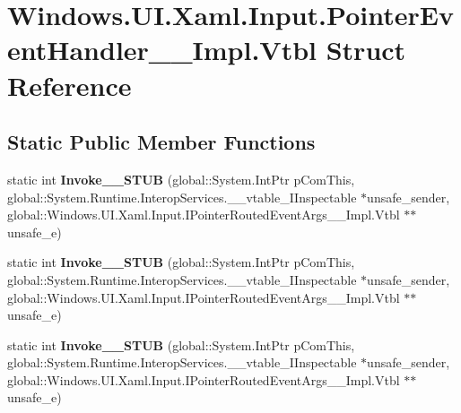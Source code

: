 \hypertarget{struct_windows_1_1_u_i_1_1_xaml_1_1_input_1_1_pointer_event_handler_____impl_1_1_vtbl}{}\section{Windows.\+U\+I.\+Xaml.\+Input.\+Pointer\+Event\+Handler\+\_\+\+\_\+\+Impl.\+Vtbl Struct Reference}
\label{struct_windows_1_1_u_i_1_1_xaml_1_1_input_1_1_pointer_event_handler_____impl_1_1_vtbl}
\subsection*{Static Public Member Functions}
\begin{DoxyCompactItemize}
\item 
\mbox{\label{struct_windows_1_1_u_i_1_1_xaml_1_1_input_1_1_pointer_event_handler_____impl_1_1_vtbl_a5eaf62a037e55b8700d73ad4051994b3}} 
static int {\bfseries Invoke\+\_\+\+\_\+\+S\+T\+UB} (global\+::\+System.\+Int\+Ptr p\+Com\+This, global\+::\+System.\+Runtime.\+Interop\+Services.\+\_\+\+\_\+vtable\+\_\+\+I\+Inspectable $\ast$unsafe\+\_\+sender, global\+::\+Windows.\+U\+I.\+Xaml.\+Input.\+I\+Pointer\+Routed\+Event\+Args\+\_\+\+\_\+\+Impl.\+Vtbl $\ast$$\ast$unsafe\+\_\+e)
\item 
\mbox{\label{struct_windows_1_1_u_i_1_1_xaml_1_1_input_1_1_pointer_event_handler_____impl_1_1_vtbl_a5eaf62a037e55b8700d73ad4051994b3}} 
static int {\bfseries Invoke\+\_\+\+\_\+\+S\+T\+UB} (global\+::\+System.\+Int\+Ptr p\+Com\+This, global\+::\+System.\+Runtime.\+Interop\+Services.\+\_\+\+\_\+vtable\+\_\+\+I\+Inspectable $\ast$unsafe\+\_\+sender, global\+::\+Windows.\+U\+I.\+Xaml.\+Input.\+I\+Pointer\+Routed\+Event\+Args\+\_\+\+\_\+\+Impl.\+Vtbl $\ast$$\ast$unsafe\+\_\+e)
\item 
\mbox{\label{struct_windows_1_1_u_i_1_1_xaml_1_1_input_1_1_pointer_event_handler_____impl_1_1_vtbl_a5eaf62a037e55b8700d73ad4051994b3}} 
static int {\bfseries Invoke\+\_\+\+\_\+\+S\+T\+UB} (global\+::\+System.\+Int\+Ptr p\+Com\+This, global\+::\+System.\+Runtime.\+Interop\+Services.\+\_\+\+\_\+vtable\+\_\+\+I\+Inspectable $\ast$unsafe\+\_\+sender, global\+::\+Windows.\+U\+I.\+Xaml.\+Input.\+I\+Pointer\+Routed\+Event\+Args\+\_\+\+\_\+\+Impl.\+Vtbl $\ast$$\ast$unsafe\+\_\+e)
$$
\end{DoxyCompactItemize}
